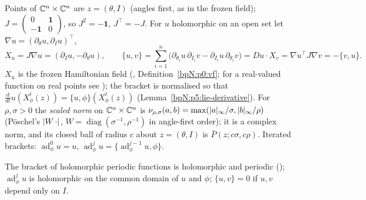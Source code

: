 \begin{definition}\label{bpN:p5:setting}
Points of $\mathbb{C}^n\times\mathbb{C}^n$ are $z=(\theta,I)$ (angles first, as in the frozen field); $J=\begin{pmatrix}0&\mathbf 1\\-\mathbf 1&0\end{pmatrix}$, so $J^2=-\mathbf 1$, $J^\top=-J$. For $u$ holomorphic on an open set let $\nabla u=(\partial_\theta u,\partial_Iu)^\top$,
\[X_u=J\nabla u=(\partial_Iu,-\partial_\theta u),\qquad\{u,v\}=\sum_{i=1}^n\bigl(\partial_{\theta_i}u\,\partial_{I_i}v-\partial_{I_i}u\,\partial_{\theta_i}v\bigr)=Du\cdot X_v=\nabla u^\top J\nabla v=-\{v,u\}.\]
$X_u$ is the frozen Hamiltonian field (, Definition~\ref{bpN:p0:vf}; for a real-valued function on real points see ); the bracket is normalised so that $\frac d{dt}u(X_\phi^t(z))=\{u,\phi\}(X_\phi^t(z))$ (Lemma~\ref{bpN:p5:lie-derivative}).
For $\rho,\sigma>0$ the \emph{scaled norm} on $\mathbb{C}^n\times\mathbb{C}^n$ is $\nu_{\rho,\sigma}(a,b)=\max(\lvert a\rvert_\infty/\sigma,\lvert b\rvert_\infty/\rho)$ (P\"oschel's $\lvert W\,\cdot\rvert$, $W=\operatorname{diag}(\sigma^{-1},\rho^{-1})$ in angle-first order); it is a complex norm, and its closed
ball of radius $c$ about $z=(\theta,I)$ is $\bar P(z;c\sigma,c\rho)$. Iterated brackets: $\operatorname{ad}^0_\phi u=u$, $\operatorname{ad}^j_\phi u=\{\operatorname{ad}^{j-1}_\phi u,\phi\}$.
\end{definition}
The bracket of holomorphic periodic functions is holomorphic and periodic (); $\operatorname{ad}^j_\phi u$ is holomorphic on the common domain of $u$ and $\phi$; $\{u,v\}=0$ if $u,v$ depend only on $I$.

